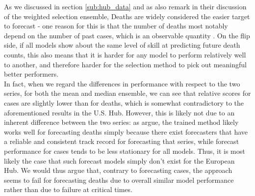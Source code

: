 As we discussed in section \ref{sub:hub_data} and as \cite{ray_comparing_2022} also remark in their discussion of the weighted selection ensemble, Deaths are widely considered the easier target to forecast - one reason for this is that the number of deaths most notably depend on the number of past cases, which is an observable quantity . On the flip side, if all models show about the same level of skill at predicting future death counts, this also means that it is harder for any model to perform relatively well to another, and therefore harder for the selection method to pick out meaningful better performers. \\
In fact, when we regard the differences in performance with respect to the two series,  for both the mean and median ensemble, we can see that relative scores for cases are slightly lower than for deaths, which is somewhat contradictory to the aforementioned results in the U.S. Hub. However, this is likely not due to an inherent difference between the two series: as \cite{ray_comparing_2022} argue, the trained method likely works well for forecasting deaths simply because there exist forecasters that have a reliable and consistent track record for forecasting that series, while forecast performance for cases tends to be less stationary for all models. Thus, it is most likely the case that such forecast models simply don't exist for the European Hub. We would thus argue that, contrary to forecasting cases, the approach seems to fail for forecasting deaths due to overall similar model performance rather than due to failure at critical times. \\
